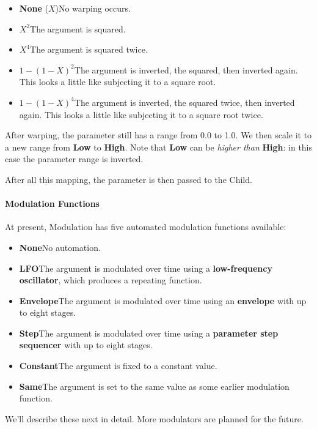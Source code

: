 \documentclass[twoside,10pt]{article}
\begin{document}
\begin{itemize}
\item {\bf None} (\(X\))\qquad No warping occurs.
\item \(X^2\)\qquad The argument is squared.
\item \(X^4\)\qquad The argument is squared twice.
\item \(1-(1-X)^2\)\qquad The argument is inverted, the squared, then inverted again.  This looks a little like subjecting it to a square root.
\item \(1-(1-X)^4\)\qquad The argument is inverted, the squared twice, then inverted again.  This looks a little like subjecting it to a square root twice.
\end{itemize}

After warping, the parameter still has a range from 0.0 to 1.0.  We then scale it to a new range from {\bf Low} to {\bf High}.  Note that {\bf Low} can be {\it higher than} {\bf High}: in this case the parameter range is inverted.

After all this mapping, the parameter is then passed to the Child.

\paragraph{Modulation Functions}

At present, Modulation has five automated modulation functions available:

\begin{itemize}
\item {\bf None}\qquad No automation.
\item {\bf LFO}\qquad The argument is modulated over time using a {\bf low-frequency oscillator}, which produces a repeating function.
\item {\bf Envelope}\qquad The argument is modulated over time using an {\bf envelope} with up to eight stages.
\item {\bf Step}\qquad The argument is modulated over time using a {\bf parameter step sequencer} with up to eight stages.
\item {\bf Constant}\qquad The argument is fixed to a constant value.
\item {\bf Same}\qquad The argument is set to the same value as some earlier modulation function.
\end{itemize}

We'll describe these next in detail.  More modulators are planned for the future.  
\end{document}
